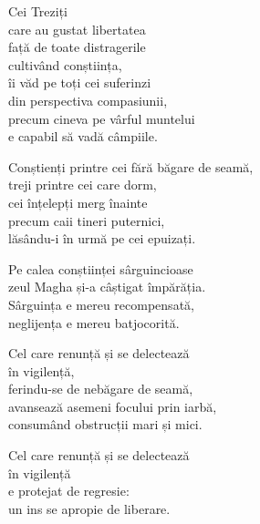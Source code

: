 Cei Treziți\\
care au gustat libertatea\\
față de toate distragerile\\
cultivând conștiința,\\
îi văd pe toți cei suferinzi\\
din perspectiva compasiunii,\\
precum cineva pe vârful muntelui\\
e capabil să vadă câmpiile.


Conștienți printre cei fără băgare de seamă,\\
treji printre cei care dorm,\\
cei înțelepți merg înainte\\
precum caii tineri puternici,\\
lăsându-i în urmă pe cei epuizați.


Pe calea conștiinței sârguincioase\\
zeul Magha și-a câștigat împărăția.\\
Sârguința e mereu recompensată,\\
neglijența e mereu batjocorită.


Cel care renunță și se delectează\\
în vigilență,\\
ferindu-se de nebăgare de seamă,\\
avansează asemeni focului prin iarbă,\\
consumând obstrucții mari și mici.


Cel care renunță și se delectează\\
în vigilență\\
e protejat de regresie:\\
un ins se apropie de liberare.
